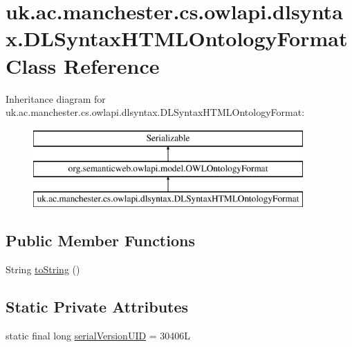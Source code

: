 \hypertarget{classuk_1_1ac_1_1manchester_1_1cs_1_1owlapi_1_1dlsyntax_1_1_d_l_syntax_h_t_m_l_ontology_format}{\section{uk.\-ac.\-manchester.\-cs.\-owlapi.\-dlsyntax.\-D\-L\-Syntax\-H\-T\-M\-L\-Ontology\-Format Class Reference}
\label{classuk_1_1ac_1_1manchester_1_1cs_1_1owlapi_1_1dlsyntax_1_1_d_l_syntax_h_t_m_l_ontology_format}
}
Inheritance diagram for uk.\-ac.\-manchester.\-cs.\-owlapi.\-dlsyntax.\-D\-L\-Syntax\-H\-T\-M\-L\-Ontology\-Format\-:\begin{figure}[H]
\begin{center}
\leavevmode
\includegraphics[height=3.000000cm]{classuk_1_1ac_1_1manchester_1_1cs_1_1owlapi_1_1dlsyntax_1_1_d_l_syntax_h_t_m_l_ontology_format}
\end{center}
\end{figure}
\subsection*{Public Member Functions}
\begin{DoxyCompactItemize}
\item 
String \hyperlink{classuk_1_1ac_1_1manchester_1_1cs_1_1owlapi_1_1dlsyntax_1_1_d_l_syntax_h_t_m_l_ontology_format_ac93827290755668079ab9e380de6b192}{to\-String} ()
\end{DoxyCompactItemize}
\subsection*{Static Private Attributes}
\begin{DoxyCompactItemize}
\item 
static final long \hyperlink{classuk_1_1ac_1_1manchester_1_1cs_1_1owlapi_1_1dlsyntax_1_1_d_l_syntax_h_t_m_l_ontology_format_ac9848ad82dce7095eb8c12bf273ff4ba}{serial\-Version\-U\-I\-D} = 30406\-L
\end{DoxyCompactItemize}
